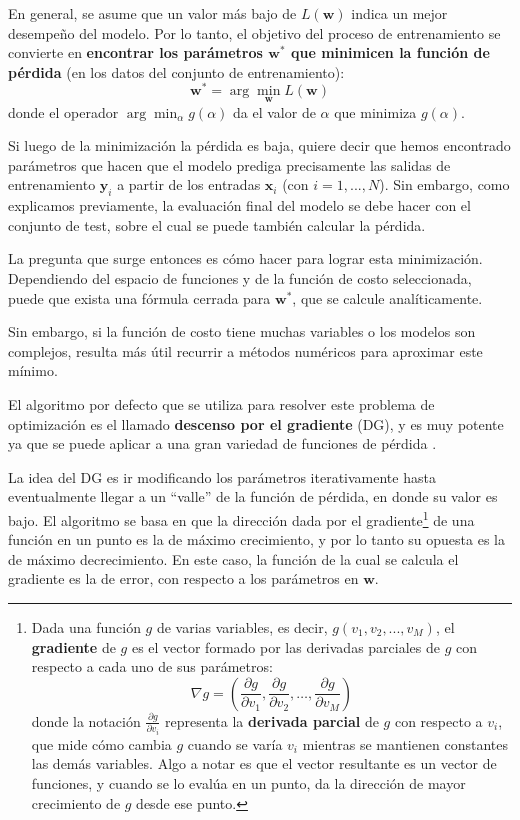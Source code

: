 \documentclass[../../main.tex]{subfiles}
\begin{document}
En general, se asume que un valor más bajo de \(L(\bm{w})\) indica un mejor desempeño del
modelo. Por lo tanto, el objetivo del proceso de entrenamiento se convierte en
\textbf{encontrar los parámetros \(\bm{w}^*\) que minimicen la función de pérdida}
(en los datos del conjunto de entrenamiento):
\[
\bm{w}^* = \arg\min_{\bm{w}} L(\bm{w})
\]
donde el operador \(\arg\min_{\alpha} g(\alpha)\) da el valor de \(\alpha\)
que minimiza \(g(\alpha)\).

Si luego de la minimización la pérdida es baja, quiere decir que hemos encontrado
parámetros que hacen que el modelo prediga precisamente las salidas de entrenamiento
\(\bm{y}_i\) a partir de los entradas \(\bm{x}_i\) (con \(i=1,...,N\)). Sin
embargo, como explicamos previamente, la evaluación final del modelo se debe hacer con el
conjunto de test, sobre el cual se puede también calcular la pérdida.

La pregunta que surge entonces es cómo hacer para lograr esta minimización. Dependiendo
del espacio de funciones y de la función de costo seleccionada, puede que exista una
fórmula cerrada para \(\bm{w}^*\), que se calcule analíticamente.

Sin embargo, si la función de costo tiene muchas variables o los modelos son complejos,
resulta más útil recurrir a métodos numéricos para aproximar este mínimo.

El algoritmo por defecto que se utiliza para resolver este problema de optimización es el
llamado \textbf{descenso por el gradiente} (DG), y es muy potente ya que se puede aplicar a
una gran variedad de funciones de pérdida \cite{ai-a-modern-approach}.

La idea del DG es ir modificando los parámetros iterativamente hasta eventualmente llegar
a un ``valle'' de la función de pérdida, en donde su valor es bajo. El algoritmo se basa
en que la dirección dada por el gradiente\footnote{Dada una función \(g\) de varias
variables, es decir, \(g(v_1, v_2, ..., v_M)\), el \textbf{gradiente} de \(g\) es el
vector formado por las derivadas parciales de \(g\) con respecto a cada uno de sus
parámetros:
\[
\nabla g = \left( \frac{\partial g}{\partial v_1}, \frac{\partial g}{\partial v_2},
\dots, \frac{\partial g}{\partial v_M} \right)
\]
donde la notación \(\frac{\partial g}{\partial v_i}\) representa la \textbf{derivada
parcial} de \(g\) con respecto a \(v_i\), que mide cómo cambia \(g\) cuando se varía
\(v_i\) mientras se mantienen constantes las demás variables. Algo a notar es que el
vector resultante es un vector de funciones, y cuando se lo evalúa en un punto, da la
dirección de mayor crecimiento de \(g\) desde ese punto.} de una función en un punto es la
de máximo crecimiento, y por lo tanto su opuesta es la de máximo decrecimiento. En este
caso, la función de la cual se calcula el gradiente es la de error, con respecto a los
parámetros en \(\bm{w}\).
\end{document}
